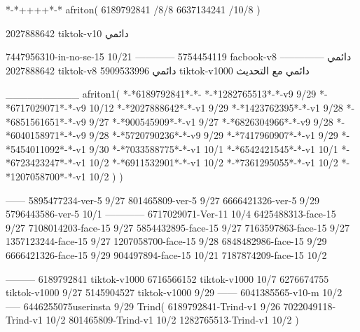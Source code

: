 *-*++++*-*
afriton(
6189792841 /8/8
6637134241 /10/8
)

2027888642 tiktok-v10
دائمي


7447956310-in-no-se-15 10/21
------------
5754454119 facbook-v8
دائمي
--------------
2027888642 tiktok-v8
دائمي
5909533996 tiktok-v1000
دائمي مع التحديث

__________
afriton1(
*-*6189792841*-*-
*-*1282765513*-*-v9 9/29
*-*6717029071*-*-v9 10/12
*-*2027888642*-*-v1 9/29
*-*1423762395*-*-v1 9/28
*-*6851561651*-*-v9 9/27
*-*900545909*-*-v1 9/27
*-*6826304966*-*-v9 9/28
*-*6040158971*-*-v9 9/28
*-*5720790236*-*-v9 9/29
*-*7417960907*-*-v1 9/29
*-*5454011092*-*-v1 9/30
*-*7033588775*-*-v1 10/1
*-*6542421545*-*-v1 10/1
*-*6723423247*-*-v1 10/2
*-*6911532901*-*-v1 10/2
*-*7361295055*-*-v1 10/2
*-*1207058700*-*-v1 10/2
)
)

------
5895477234-ver-5 9/27
801465809-ver-5 9/27
6666421326-ver-5 9/29
5796443586-ver-5 10/1
------------
6717029071-Ver-11
10/4
6425488313-face-15 9/27
7108014203-face-15 9/27
5854432895-face-15 9/27
7163597863-face-15 9/27
1357123244-face-15 9/27
1207058700-face-15 9/28
6848482986-face-15 9/29
6666421326-face-15 9/29
904497894-face-15 10/21
7187874209-face-15 10/2

---------
6189792841 tiktok-v1000
6716566152 tiktok-v1000
10/7
6276674755 tiktok-v1000
9/27
5145904527 tiktok-v1000
9/29
------
6041385565-v10-m 10/2
-----
6446255075userinsta 9/29
Trind(
6189792841-Trind-v1 9/26
7022049118-Trind-v1 10/2
801465809-Trind-v1 10/2
1282765513-Trind-v1 10/2
)
